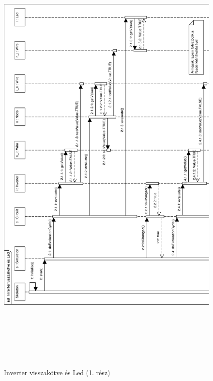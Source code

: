 \begin{figure}[H]
\begin{center}
\includegraphics[height=23cm]{chapters/chapter05/imgs/test4-1.pdf}
\caption{Inverter visszakötve és Led (1. rész)}
\label{fig:test4_1}
\end{center}
\end{figure}

